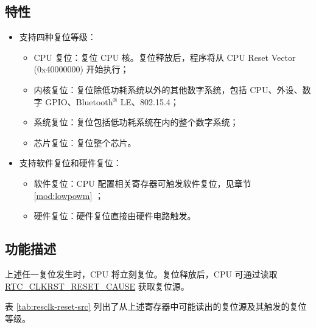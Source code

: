 \documentclass[main\_\_CN.tex]{subfiles}
\begin{document}
\subsection{特性}
\label{sec:resclk-features}
\begin{itemize}
    \item 支持四种复位等级：
    \begin{itemize}
    \item CPU 复位：复位 CPU 核。复位释放后，程序将从 CPU Reset Vector (0x40000000) 开始执行；
    \item 内核复位：复位除低功耗系统以外的其他数字系统，包括 CPU、外设、数字 GPIO、Bluetooth$^®$ LE、802.15.4；
    \item 系统复位：复位包括低功耗系统在内的整个数字系统；
    \item 芯片复位：复位整个芯片。
    \end{itemize}
    \item 支持软件复位和硬件复位：
    \begin{itemize}
        \item 软件复位：CPU 配置相关寄存器可触发软件复位，见章节 \ref{mod:lowpowm} \textit{}；
        \item 硬件复位：硬件复位直接由硬件电路触发。
    \end{itemize}
\end{itemize}

\subsection{功能描述}
上述任一复位发生时，CPU 将立刻复位。复位释放后，CPU 可通过读取 \hyperref[fielddesc:RTCCLKRSTRESETCAUSE]{RTC\_CLKRST\_RESET\_CAUSE} 获取复位源。

表 \ref{tab:resclk-reset-src} 列出了从上述寄存器中可能读出的复位源及其触发的复位等级。
\end{document}
